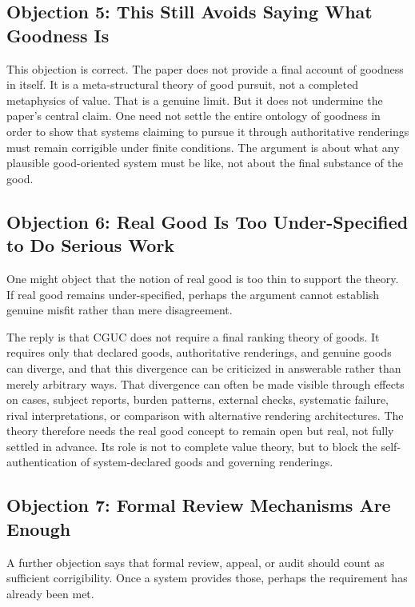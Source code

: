 \documentclass[11pt]{article}
\begin{document}
\subsection{Objection 5: This Still Avoids Saying What Goodness Is}

This objection is correct. The paper does not provide a final account of goodness in itself. It is a meta-structural theory of good pursuit, not a completed metaphysics of value. That is a genuine limit. But it does not undermine the paper's central claim. One need not settle the entire ontology of goodness in order to show that systems claiming to pursue it through authoritative renderings must remain corrigible under finite conditions. The argument is about what any plausible good-oriented system must be like, not about the final substance of the good.

\subsection{Objection 6: Real Good Is Too Under-Specified to Do Serious Work}

One might object that the notion of real good is too thin to support the theory. If real good remains under-specified, perhaps the argument cannot establish genuine misfit rather than mere disagreement.

The reply is that CGUC does not require a final ranking theory of goods. It requires only that declared goods, authoritative renderings, and genuine goods can diverge, and that this divergence can be criticized in answerable rather than merely arbitrary ways. That divergence can often be made visible through effects on cases, subject reports, burden patterns, external checks, systematic failure, rival interpretations, or comparison with alternative rendering architectures.\cite{Sen1999DevelopmentFreedom,Nussbaum2006FrontiersJustice} The theory therefore needs the real good concept to remain open but real, not fully settled in advance. Its role is not to complete value theory, but to block the self-authentication of system-declared goods and governing renderings.

\subsection{Objection 7: Formal Review Mechanisms Are Enough}

A further objection says that formal review, appeal, or audit should count as sufficient corrigibility. Once a system provides those, perhaps the requirement has already been met.
\end{document}
